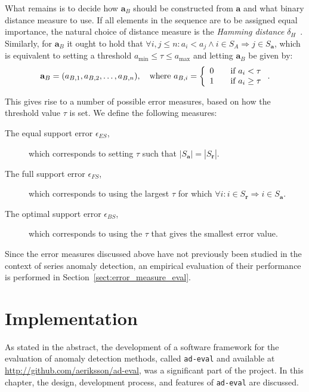 What remains is to decide how $\mathbf{a}_B$ should be constructed from $\mathbf{a}$ and what binary distance measure to use. If all elements in the sequence are to be assigned equal importance, the natural choice of distance measure is the \emph{Hamming distance} $\delta_H$~\cite{TODO}. Similarly, for $\mathbf{a}_B$ it ought to hold that $\forall i, j \leq n: a_i < a_j \wedge i \in S_A \Rightarrow j \in S_\mathbf{a}$, which is equivalent to setting a threshold $a_{\min} \leq \tau \leq a_{\max}$ and letting $\mathbf{a}_B$ be given by:
\[
    \mathbf{a}_B = (a_{B,1}, a_{B,2}, \dots, a_{B,n}), \quad \text{where } a_{B,i} = \left\{
    \begin{array}{l l}
        0 & \quad \text{if } a_i < \tau \\
        1 & \quad \text{if } a_i \geq \tau
    \end{array} \right..
\]

This gives rise to a number of possible error measures, based on how the threshold value $\tau$ is set. We define the following measures:
\begin{description}
    \item[The equal support error $\epsilon_{ES}$,]which corresponds to setting $\tau$ such that $|S_\mathbf{a}| = |S_\mathbf{r}|$.
    \item[The full support error $\epsilon_{FS}$,]which corresponds to using the largest $\tau$ for which $\forall i: i \in S_\mathbf{r} \Rightarrow i \in S_\mathbf{a}$.
    \item[The optimal support error $\epsilon_{BS}$,]which corresponds to using the $\tau$ that gives the smallest error value.
\end{description}

Since the error measures discussed above have not previously been studied in the context of series anomaly detection, an empirical evaluation of their performance is performed in Section~\ref{sect:error_measure_eval}.

\section{Implementation}
\label{ch:implementation}

As stated in the abstract, the development of a software framework for the evaluation of anomaly detection methods, called \texttt{ad-eval} and available at \url{http://github.com/aeriksson/ad-eval}, was a significant part of the project. In this chapter, the design, development process, and features of \texttt{ad-eval} are discussed.

